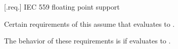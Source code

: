  [\iotwod.req.\iecfivefivenine] {IEC 559 floating point support}

\pnum
Certain requirements of this \documenttypename{} assume that 
 evaluates to .

\pnum
The 
behavior of these requirements is  
if  evaluates to .

%
